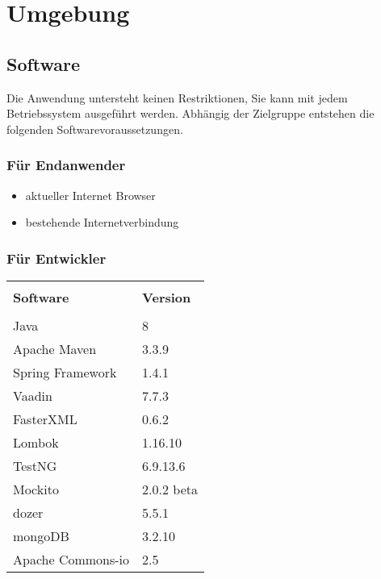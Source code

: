  \section{Umgebung}
 
\subsection{Software}

Die Anwendung untersteht keinen Restriktionen, Sie kann mit jedem Betriebssystem ausgeführt werden.
Abhängig der Zielgruppe entstehen die folgenden Softwarevoraussetzungen.

\subsubsection {Für Endanwender}

\begin{itemize}
\item aktueller Internet Browser 
\item bestehende Internetverbindung
\end{itemize}

\subsubsection	{Für Entwickler}

\begin{table}[H]
\begin{center}
\begin{tabular}{|ll|}
\hline \cellcolor{blue!25} & \cellcolor{blue!25}\\[-0.4cm]
\cellcolor{blue!25} \textbf{Software} &  \cellcolor{blue!25} \textbf{Version} \\ 
\hline& \\[-0.4cm]
Java              & 8                \\[0.1cm]
Apache Maven      & 3.3.9            \\[0.1cm]
Spring Framework  & 1.4.1            \\[0.1cm] 
Vaadin            & 7.7.3            \\[0.1cm]
FasterXML         & 0.6.2            \\[0.1cm]
Lombok            & 1.16.10          \\[0.1cm]
TestNG            & 6.9.13.6         \\[0.1cm]
Mockito           & 2.0.2 beta       \\[0.1cm]
dozer             & 5.5.1            \\[0.1cm]
mongoDB           & 3.2.10            \\[0.1cm]
Apache Commons-io & 2.5 \\
\hline             
\end{tabular}
\end{center}
\end{table}
 
